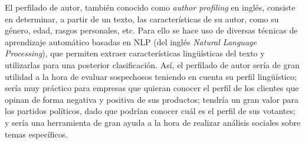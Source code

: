 \bigskip
El perfilado de autor, también conocido como \textit{author profiling} en inglés, consiste en determinar, a partir de un texto, 
las características de su autor, como su género, edad, rasgos personales, etc. Para ello se hace uso de diversas técnicas de aprendizaje automático
basadas en NLP (del inglés \textit{Natural Language Processing}), que permiten extraer características lingüísticas del texto y utilizarlas para una
posterior clasificación. Así, el perfilado de autor sería de gran utilidad a la hora de evaluar sospechosos teniendo en cuenta su perfil lingüístico;
sería muy práctico para empresas que quieran conocer el perfil de los clientes que opinan de forma negativa y positiva de sus productos; tendría un gran valor
para los partidos políticos, dado que podrían conocer cuál es el perfil de sus votantes; y sería una herramienta de gran ayuda a la hora de realizar
análisis sociales sobre temas específicos.